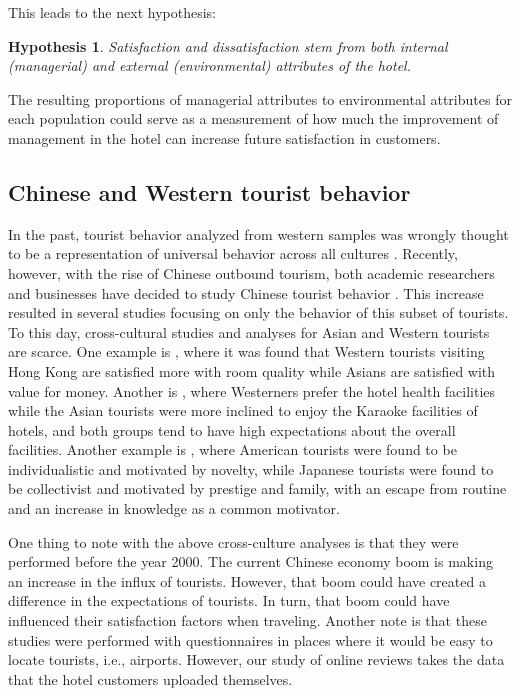 \documentclass[smallextended,natbib]{svjour3}       %
\newtheorem{hyp}{Hypothesis}
\begin{document}
This leads to the next hypothesis:

\begin{hyp}
\label{hyp:man_env}
Satisfaction and dissatisfaction stem from both internal (managerial) and external (environmental) attributes of the hotel.
\end{hyp}

The resulting proportions of managerial attributes to environmental attributes for each population could serve as a measurement of how much the improvement of management in the hotel can increase future satisfaction in customers.

\subsection{Chinese and Western tourist behavior}\label{theory_zh_en}

In the past, tourist behavior analyzed from western samples was wrongly thought to be a representation of universal behavior across all cultures \cite[][]{nielsen2017, jones2010WEIRD, guaratne2009, hogan1978biases}. Recently, however, with the rise of Chinese outbound tourism, both academic researchers and businesses have decided to study Chinese tourist behavior \cite[][]{sun2017}. This increase resulted in several studies focusing on only the behavior of this subset of tourists. To this day, cross-cultural studies and analyses for Asian and Western tourists are scarce. One example is \cite{choi2000}, where it was found that Western tourists visiting Hong Kong are satisfied more with room quality while Asians are satisfied with value for money. Another is  \cite{bauer1993changing}, where Westerners prefer the hotel health facilities while the Asian tourists were more inclined to enjoy the Karaoke facilities of hotels, and both groups tend to have high expectations about the overall facilities. Another example is \cite{kim2000}, where American tourists were found to be individualistic and motivated by novelty, while Japanese tourists were found to be collectivist and motivated by prestige and family, with an escape from routine and an increase in knowledge as a common motivator. 

One thing to note with the above cross-culture analyses is that they were performed before the year 2000. The current Chinese economy boom is making an increase in the influx of tourists. However, that boom could have created a difference in the expectations of tourists. In turn, that boom could have influenced their satisfaction factors when traveling. Another note is that these studies were performed with questionnaires in places where it would be easy to locate tourists, i.e., airports. However, our study of online reviews takes the data that the hotel customers uploaded themselves.
\end{document}
